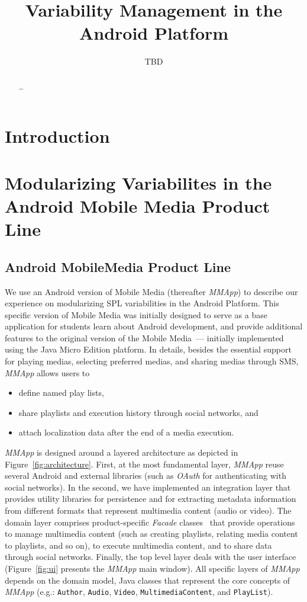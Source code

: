 \documentclass{article}
\author{TBD}
\title{Variability Management in the Android Platform}
\newcommand{\mapp}{\emph{MMApp}}
\begin{document}
\maketitle 

\begin{abstract}
\ldots
\end{abstract}

\section{Introduction}

\section{Modularizing Variabilites in the Android Mobile Media Product Line}

\subsection{Android MobileMedia Product Line}

We use an Android version of  Mobile Media (thereafter \mapp) to describe our experience on modularizing 
SPL variabilities in the Android Platform. This specific version of
Mobile Media was initially designed to serve as a base application for
students learn about Android development, 
and provide additional features to the 
original version of the Mobile Media~\cite{}--- initially implemented
using the  Java Micro Edition platform. In details, besides the
essential support for playing medias, selecting preferred medias, and sharing
medias through SMS, \mapp{} allows users to 

\begin{itemize}
\item define named play lists, 
\item share playlists and execution history through social networks, and 
\item attach localization data after the end of a media execution.
\end{itemize}

\mapp{} is designed around a layered architecture  as depicted in
Figure~\ref{fig:architecture}. First, at the most fundamental layer, \mapp{} reuse several
Android and external libraries (such as \emph{OAuth} for
authenticating with social networks). In the second, we have implemented
an integration layer that provides utility libraries for persistence and for
extracting metadata information from different formats that
represent multimedia content (audio or video). The domain layer
comprises product-specific \emph{Facade} classes~\cite{} that provide operations to manage multimedia content
(such as creating playlists, relating media content to playlists, and
so on), to execute multimedia content, and to
share data through social networks. Finally, the top level layer
deals with the user interface (Figure~\ref{fig:ui} presents the \mapp{} main
window). All specific layers of \mapp{} depends
on the domain model, Java classes that represent the core concepts of
\mapp{} (e.g.: \texttt{Author}, \texttt{Audio}, \texttt{Video},
\texttt{MultimediaContent}, and \texttt{PlayList}).   
\end{document}

